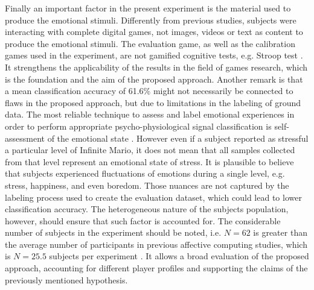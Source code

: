 Finally an important factor in the present experiment is the material used to produce the emotional stimuli. Differently from previous studies, subjects were interacting with complete digital games, not images, videos or text as content to produce the emotional stimuli. The evaluation game, as well as the calibration games used in the experiment, are not gamified cognitive tests, e.g. Stroop test \parencite{golden1978stroop}. It strengthens the applicability of the results in the field of games research, which is the foundation and the aim of the proposed approach. Another remark is that a mean classification accuracy of 61.6\% might not necessarily be connected to flaws in the proposed approach, but due to limitations in the labeling of ground data. The most reliable technique to assess and label emotional experiences in order to perform appropriate psycho-physiological signal classification is self-assessment of the emotional state \parencite{moghimi2017affective}. However even if a subject reported as stressful a particular level of Infinite Mario, it does not mean that all samples collected from that level represent an emotional state of stress. It is plausible to believe that subjects experienced fluctuations of emotions during a single level, e.g. stress, happiness, and even boredom. Those nuances are not captured by the labeling process used to create the evaluation dataset, which could lead to lower classification accuracy. The heterogeneous nature of the subjects population, however, should ensure that such factor is accounted for. The considerable number of subjects in the experiment should be noted, i.e. $N=62$ is greater than the average number of participants in previous affective computing studies, which is $N=25.5$ subjects per experiment \textcite{moghimi2017affective}. It allows a broad evaluation of the proposed approach, accounting for different player profiles and supporting the claims of the previously mentioned hypothesis.





